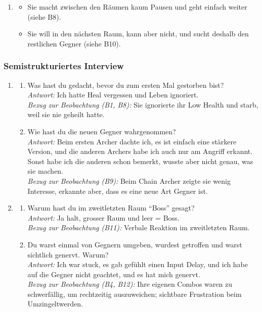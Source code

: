 \documentclass[../Main.tex]{subfiles}
\begin{document}
\begin{enumerate}[label=\textbf{B\arabic*}, leftmargin=1.5cm, itemsep=0.8em, resume]
\item
\begin{itemize}[nosep]
    \item Sie macht zwischen den Räumen kaum Pausen und geht einfach weiter (siehe B8).
    \item Sie will in den nächsten Raum, kann aber nicht, und sucht deshalb den restlichen Gegner (siehe B10).
\end{itemize}
\end{enumerate}

\subsubsection{Semistrukturiertes Interview}

\begin{enumerate}[label=\textbf{I\arabic*}, leftmargin=1.5cm, itemsep=1em]
\item
\begin{enumerate}[label=\alph*), itemsep=0.6em]
\item Was hast du gedacht, bevor du zum ersten Mal gestorben bist? \\
    \textit{Antwort:} Ich hatte Heal vergessen und Leben ignoriert. \\
    \textit{Bezug zur Beobachtung (B1, B8):} Sie ignorierte ihr Low Health und starb, weil sie nie geheilt hatte.
\item Wie hast du die neuen Gegner wahrgenommen? \\
    \textit{Antwort:} Beim ersten Archer dachte ich, es ist einfach eine stärkere Version, und die anderen Archers habe ich auch nur am Angriff erkannt. Sonst habe ich die anderen schon bemerkt, wusste aber nicht genau, was sie machen. \\
    \textit{Bezug zur Beobachtung (B9):} Beim Chain Archer zeigte sie wenig Interesse, erkannte aber, dass es eine neue Art Gegner ist.
\end{enumerate}

\item
\begin{enumerate}[label=\alph*), itemsep=0.6em]
\item Warum hast du im zweitletzten Raum \enquote{Boss} gesagt? \\
\textit{Antwort:} Ja halt, grosser Raum und leer = Boss. \\
\textit{Bezug zur Beobachtung (B11):} Verbale Reaktion im zweitletzten Raum.
\item Du warst einmal von Gegnern umgeben, wurdest getroffen und warst sichtlich genervt. Warum? \\
\textit{Antwort:} Ich war stuck, es gab gefühlt einen Input Delay, und ich habe auf die Gegner nicht geachtet, und es hat mich genervt. \\
\textit{Bezug zur Beobachtung (B4, B12):} Ihre eigenen Combos waren zu schwerfällig, um rechtzeitig auszuweichen; sichtbare Frustration beim Umzingeltwerden.
\end{enumerate}


\end{enumerate}
\end{document}
